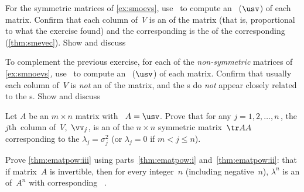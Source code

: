 \begin{exercise}  
For the symmetric matrices of \cref{ex:smoevs}, use \script\ to compute an \svd\ (\(\usv\)) of each matrix.
Confirm that each column of~\(V\) is an  of the matrix (that is, proportional to what the exercise found) and the corresponding  is the  of the corresponding  (\cref{thm:smevec}).
Show and discuss 
\end{exercise}




\begin{exercise}  
To complement the previous exercise, for each of the \emph{non-symmetric} matrices of \cref{ex:smnoevs}, use \script\ to compute an \svd\ (\(\usv\)) of each matrix.
Confirm that usually each column of~\(V\) is \emph{not} an  of the matrix, and the s do \emph{not} appear closely related to the s.
Show and discuss 
\end{exercise}











\begin{exercise}  
Let \(A\) be an \(m\times n\)  matrix with \svd\ \(A=\usv\).
Prove that for any \(j=1,2,\ldots,n\)\,, the \(j\)th~column of~\(V\),~\(\vv_j\), is an  of the \(n\times n\) {symmetric matrix}~\(\tr AA\) corresponding to the  \(\lambda_j=\sigma_j^2\) (or \(\lambda_j=0\) if \(m<j\leq n\)).
\end{exercise}



\begin{exercise} \label{ex:ematpow:iii} 
Prove \cref{thm:ematpow:iii} using parts~\ref{thm:ematpow:i} 
and~\ref{thm:ematpow:ii}: that if matrix~\(A\) is {invertible}, then 
for every integer~\(n\) (including negative~\(n\)), \(\lambda^n\) is an  
of~\(A^n\) with corresponding ~\xv.
\end{exercise}





